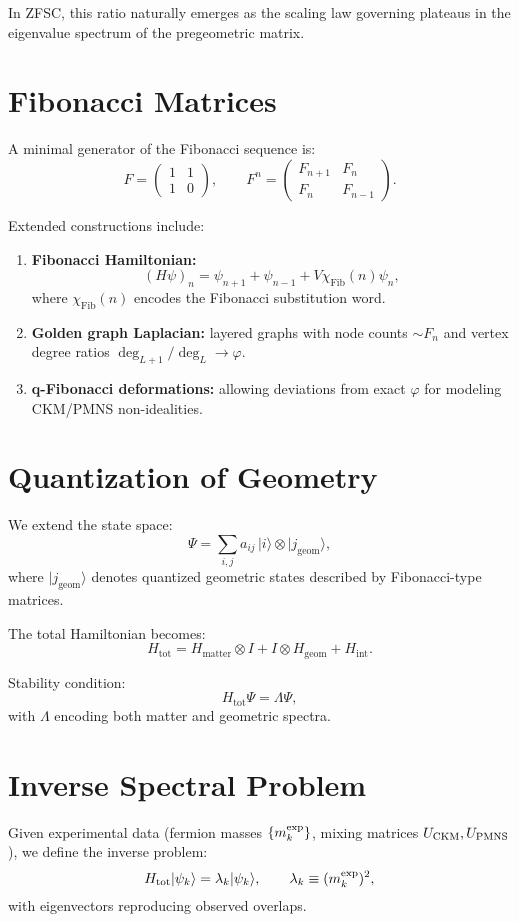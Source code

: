 \documentclass[12pt,a4paper]{article}
\begin{document}
In ZFSC, this ratio naturally emerges as the scaling law governing plateaus in the eigenvalue spectrum of the pregeometric matrix.

\section{Fibonacci Matrices}
A minimal generator of the Fibonacci sequence is:
\[
F = \begin{pmatrix} 1 & 1 \\ 1 & 0 \end{pmatrix}, \qquad
F^n = \begin{pmatrix} F_{n+1} & F_n \\ F_n & F_{n-1} \end{pmatrix}.
\]

Extended constructions include:
\begin{enumerate}
    \item \textbf{Fibonacci Hamiltonian:}
    \[
    (H\psi)_n = \psi_{n+1} + \psi_{n-1} + V \chi_{\text{Fib}}(n)\psi_n ,
    \]
    where $\chi_{\text{Fib}}(n)$ encodes the Fibonacci substitution word.
    \item \textbf{Golden graph Laplacian:} layered graphs with node counts $\sim F_n$ and vertex degree ratios $\deg_{L+1}/\deg_L \to \varphi$.
    \item \textbf{q-Fibonacci deformations:} allowing deviations from exact $\varphi$ for modeling CKM/PMNS non-idealities.
\end{enumerate}

\section{Quantization of Geometry}
We extend the state space:
\[
\Psi = \sum_{i,j} a_{ij}\, |i\rangle \otimes |j_{\text{geom}}\rangle ,
\]
where $|j_{\text{geom}}\rangle$ denotes quantized geometric states described by Fibonacci-type matrices.

The total Hamiltonian becomes:
\[
H_{\text{tot}} = H_{\text{matter}} \otimes I + I \otimes H_{\text{geom}} + H_{\text{int}}.
\]

Stability condition:
\[
H_{\text{tot}} \Psi = \Lambda \Psi ,
\]
with $\Lambda$ encoding both matter and geometric spectra.

\section{Inverse Spectral Problem}
Given experimental data (fermion masses $\{m_k^{\rm exp}\}$, mixing matrices $U_{\rm CKM}, U_{\rm PMNS}$), we define the inverse problem:
\[
H_{\text{tot}} | \psi_k \rangle = \lambda_k | \psi_k \rangle, \qquad \lambda_k \equiv (m_k^{\rm exp})^2,
\]
with eigenvectors reproducing observed overlaps.
\end{document}
